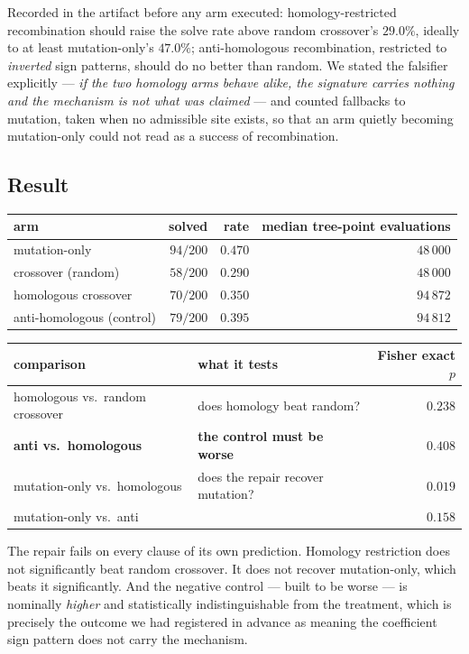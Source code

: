 \documentclass[11pt,a4paper]{article}
\theoremstyle{definition}
\theoremstyle{remark}
\begin{document}
Recorded in the artifact before any arm executed: homology-restricted
recombination should raise the solve rate above random crossover's $29.0\%$,
ideally to at least mutation-only's $47.0\%$; anti-homologous recombination,
restricted to \emph{inverted} sign patterns, should do no better than random. We
stated the falsifier explicitly --- \emph{if the two homology arms behave alike,
the signature carries nothing and the mechanism is not what was claimed} --- and
counted fallbacks to mutation, taken when no admissible site exists, so that an
arm quietly becoming mutation-only could not read as a success of recombination.

\subsection{Result}

\begin{center}
\begin{tabular}{lrrr}
\toprule
arm & solved & rate & median tree-point evaluations \\
\midrule
mutation-only              & $94/200$ & $0.470$ & $48\,000$ \\
crossover (random)         & $58/200$ & $0.290$ & $48\,000$ \\
homologous crossover       & $70/200$ & $0.350$ & $94\,872$ \\
anti-homologous (control)  & $79/200$ & $0.395$ & $94\,812$ \\
\bottomrule
\end{tabular}
\end{center}

\begin{center}
\begin{tabular}{llr}
\toprule
comparison & what it tests & Fisher exact $p$ \\
\midrule
homologous vs.\ random crossover & does homology beat random? & $0.238$ \\
\textbf{anti vs.\ homologous} & \textbf{the control must be worse} & $\mathbf{0.408}$ \\
mutation-only vs.\ homologous & does the repair recover mutation? & $\mathbf{0.019}$ \\
mutation-only vs.\ anti & & $0.158$ \\
\bottomrule
\end{tabular}
\end{center}

The repair fails on every clause of its own prediction. Homology restriction
does not significantly beat random crossover. It does not recover mutation-only,
which beats it significantly. And the negative control --- built to be worse ---
is nominally \emph{higher} and statistically indistinguishable from the
treatment, which is precisely the outcome we had registered in advance as
meaning the coefficient sign pattern does not carry the mechanism.
\end{document}
